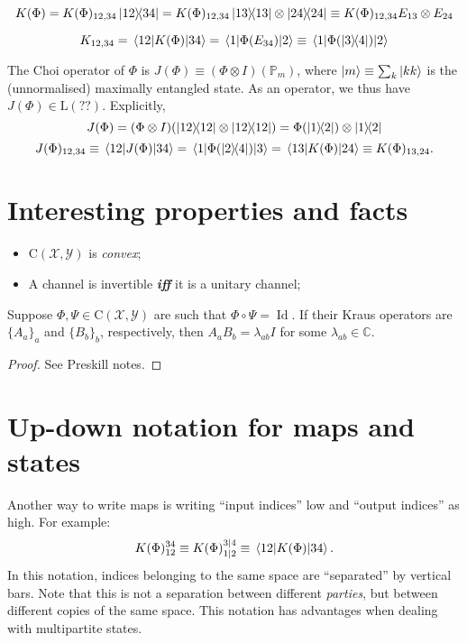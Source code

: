 \documentclass[12pt]{report}
\newcommand{\CC}{\mathbb{C}}
\newcommand{\PP}{\mathbb{P}}
\newcommand{\calY}{{\mathcal{Y}}}
\newcommand{\calX}{{\mathcal{X}}}
\newcommand{\rmC}{{\mathrm{C}}}
\newcommand{\rmL}{{\mathrm{L}}}
\DeclareMathOperator{\Id}{Id}
\begin{document}
\begin{equation}
	K(\Phi)
	= K(\Phi)_{12,34} \ketbra{12}{34}
	= K(\Phi)_{12,34} \ketbra{13}\otimes\ketbra{24}
	\equiv K(\Phi)_{12,34} E_{13}\otimes E_{24}
\end{equation}

\begin{equation}
	K_{12,34} = \mel{12}{K(\Phi)}{34}
	= \mel{1}{\Phi(E_{34})}{2}
	\equiv \mel{1}{\Phi(\ketbra{3}{4})}{2}
\end{equation}

The Choi operator of $\Phi$ is $J(\Phi)\equiv (\Phi\otimes I)(\PP_m)$, where $\ket m\equiv\sum_k \ket{kk}$ is the (unnormalised) maximally entangled state.
As an operator, we thus have $J(\Phi)\in\rmL(??)$.
Explicitly,
\begin{equation}
	J(\Phi) = (\Phi\otimes I)(\ketbra{12}\otimes\ketbra{12})
	= \Phi(\ketbra{1}{2})\otimes \ketbra{1}{2}
\end{equation}
\begin{equation}
	J(\Phi)_{12,34}
	\equiv \mel{12}{J(\Phi)}{34}
	= \mel{1}{\Phi(\ketbra{2}{4})}{3}
	= \mel{13}{K(\Phi)}{24}
	\equiv K(\Phi)_{13,24}.
\end{equation}

\section{Interesting properties and facts}

\begin{itemize}
	\item $\rmC(\calX,\calY)$ is \emph{convex};
	\item A channel is invertible \emph{\textbf{iff}} it is a unitary channel;
\end{itemize}

\begin{thm}
	Suppose $\Phi,\Psi\in\rmC(\calX,\calY)$ are such that $\Phi\circ\Psi=\Id$. If their Kraus operators are $\{A_a\}_a$ and $\{B_b\}_b$, respectively, then $A_a B_b=\lambda_{ab} I$ for some $\lambda_{ab}\in\CC$.
\end{thm}
\begin{proof}
	See Preskill notes.
\end{proof}

\section{Up-down notation for maps and states}

Another way to write maps is writing ``input indices'' low and ``output indices'' as high. For example:
\begin{equation}
	K(\Phi)_{12}^{34}\equiv K(\Phi)_{1|2}^{3|4} \equiv \mel{12}{K(\Phi)}{34}.
\end{equation}
In this notation, indices belonging to the same space are ``separated'' by vertical bars.
Note that this is not a separation between different \emph{parties}, but between different copies of the same space.
This notation has advantages when dealing with multipartite states.
\end{document}
